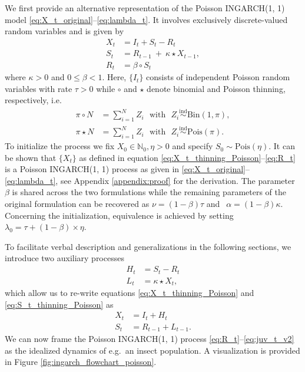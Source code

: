 \documentclass[review]{elsarticle}
\begin{document}
We first provide an alternative representation of the Poisson INGARCH(1, 1) model \eqref{eq:X_t_original}--\eqref{eq:lambda_t}. It involves exclusively discrete-valued random variables and is given by
\begin{align}
X_t & = I_t + S_t - R_t \label{eq:X_t_thinning_Poisson}\\
S_t & = R_{t - 1} \ + \ \kappa \star X_{t - 1},\label{eq:S_t_thinning_Poisson}\\
R_t & = \beta \circ S_t \label{eq:R_t}
\end{align}
where $\kappa > 0$ and $0 \leq \beta < 1$. Here, $\{I_t\}$ consists of independent Poisson random variables with rate $\tau > 0$ while $\circ$ and $\star$ denote binomial and Poisson thinning, respectively, i.e.\
\begin{align*}
\pi \circ N & = \sum_{i = 1}^N Z_i \ \ \ \text{with} \ \ \ Z_i \stackrel{\text{ind}}{\sim} \text{Bin}(1, \pi), \\
\pi \star N & = \sum_{i = 1}^N Z_i \ \ \ \text{with} \ \ \ Z_i \stackrel{\text{ind}}{\sim} \text{Pois}(\pi).
\end{align*}
To initialize the process we fix $X_0 \in \mathbb{N}_0, \eta > 0$ and specify $S_0 \sim \text{Pois}\left(\eta \right)$. It can be shown that $\{X_t\}$ as defined in equation \eqref{eq:X_t_thinning_Poisson}--\eqref{eq:R_t} is a Poisson INGARCH(1, 1) process as given in \eqref{eq:X_t_original}--\eqref{eq:lambda_t}, see Appendix \ref{appendix:proof} for the derivation. The parameter $\beta$ is shared across the two formulations while the remaining parameters of the original formulation can be recovered as
$
\nu = (1 - \beta)\tau$ and $ \ \
\alpha = (1 - \beta)\kappa.
$
Concerning the initialization, equivalence is achieved by setting $\lambda_0 = \tau + (1 - \beta) \times \eta$.

To facilitate verbal description and generalizations in the following sections, we introduce two auxiliary processes
\begin{align}
H_t & = S_t - R_t \label{eq:H_t}\\
L_t & = \kappa \star X_t \label{eq:L_t},
\end{align}
which allow us to re-write equations \eqref{eq:X_t_thinning_Poisson} and \eqref{eq:S_t_thinning_Poisson} as
\begin{align}
X_t & = I_t + H_t\label{eq:X_t_v2}\\
S_t & = R_{t - 1} + L_{t - 1}.\label{eq:juv_t_v2}
\end{align}
We can now frame the Poisson INGARCH(1, 1) process \eqref{eq:R_t}--\eqref{eq:juv_t_v2} as the idealized dynamics of e.g.\ an insect population. A visualization is provided in Figure \ref{fig:ingarch_flowchart_poisson}.
\end{document}
